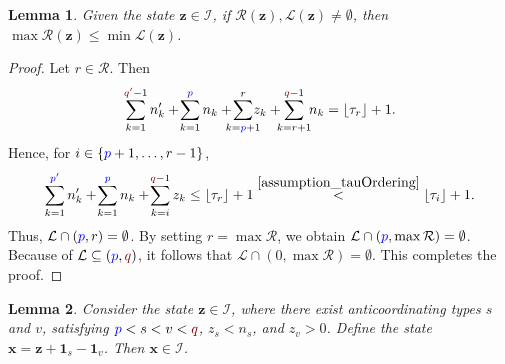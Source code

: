 \documentclass[10 pt,twocolumn,journal]{IEEEtran}
\DeclarePairedDelimiter{\floor}{\lfloor}{\rfloor}
\theoremstyle{plain}
\newtheorem{lemma}{Lemma}
\newcommand{\I}{\mathcal{I}}
\newcommand{\R}{\mathcal{R}}
\renewcommand{\L}{\mathcal{L}}
\newcommand{\x}{\bm{x}}
\newcommand{\z}{\bm{z}}
\newcommand{\p}{\tb{p}}
\newcommand{\pp}{\tb{p'}}
\newcommand{\q}{\tr{q}}
\newcommand{\qq}{\tr{q'}}
\newcommand{\tb}{\textcolor{blue}}
\newcommand{\tr}{\textcolor{Myred}}
\theoremstyle{definition}
\begin{document}
\begin{lemma} \label{lem_stability0}
    Given the state $\z\in\I$, if $\R(\z),\L(\z)\neq \emptyset$, then
    $\max\R(\z) \leq \min\L(\z)$.
\end{lemma}
\begin{proof}
    Let $r\in\R$.
    Then
\begin{equation*}
    \sum_{k=1}^{\qq-1} n'_k +\! \sum_{k=1}^{\p} n_k +\!\!\!\! \sum_{k=\p+1}^{r}\!\!\!\! z_k + \!\!\!\sum_{k=r+1}^{\q-1}\!\! n_k
    = \floor{\tau_r}+1.
\end{equation*}
Hence, for $i\in\{\p+1,\ldots, r-1\}$, 
\begin{equation*}
    \sum_{k=1}^{\pp} n'_k +\! \sum_{k=1}^{\p} n_k +\! \sum_{k=i}^{\q-1} z_k
    \leq \floor{\tau_r}+1
    \overset{\eqref{assumption_tauOrdering}}{<} \floor{\tau_{i}}+1.
\end{equation*}
Thus, $\L\cap(\p,r) = \emptyset$.
By setting $r=\max\R$, we obtain $\L\cap(\p,\max\R) = \emptyset$.
Because of $\L\subseteq(\p,\q)$, it follows that $\L\cap(0,\max\R) = \emptyset$.
This completes the proof.
\end{proof}
%
\begin{lemma}   \label{lem_stability4}
    Consider the state $\z\in\I$, where there exist anticoordinating types $s$ and $v$, satisfying $\p<s<v<\q$, $z_s< n_s$, and $z_v> 0$.
    Define the state $\x = \z + \bm{1}_s - \bm{1}_v$.
    Then $\x\in\I$.
\end{lemma}
\end{document}
